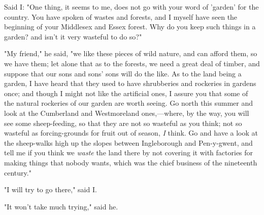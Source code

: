 Said I: "One thing, it seems to me, does not go with your word of
'garden' for the country. You have spoken of wastes and forests, and I
myself have seen the beginning of your Middlesex and Essex forest. Why
do you keep such things in a garden? and isn't it very wasteful to do
so?"

"My friend," he said, "we like these pieces of wild nature, and can
afford them, so we have them; let alone that as to the forests, we need
a great deal of timber, and suppose that our sons and sons' sons will do
the like. As to the land being a garden, I have heard that they used to
have shrubberies and rockeries in gardens once; and though I might not
like the artificial ones, I assure you that some of the natural
rockeries of our garden are worth seeing. Go north this summer and look
at the Cumberland and Westmoreland ones,---where, by the way, you will
see some sheep-feeding, so that they are not so wasteful as you think;
not so wasteful as forcing-grounds for fruit out of season, \emph{I}
think. Go and have a look at the sheep-walks high up the slopes between
Ingleborough and Pen-y-gwent, and tell me if you think we \emph{waste}
the land there by not covering it with factories for making things that
nobody wants, which was the chief business of the nineteenth century."

"I will try to go there," said I.

"It won't take much trying," said he.
